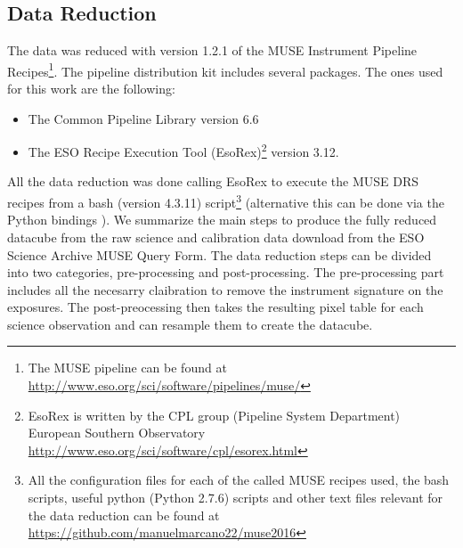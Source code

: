 \subsection{Data Reduction}

The data was reduced with version 1.2.1 of the MUSE Instrument Pipeline Recipes\footnote{The MUSE pipeline can be found at \url{http://www.eso.org/sci/software/pipelines/muse/}}\citep{weilbacher_design_2012}. The pipeline distribution kit includes several packages. The ones used for this work are the following:

\begin{itemize}
        \item The Common Pipeline Library version 6.6 \citep{mckay_common_2004}
        \item The ESO Recipe Execution Tool (EsoRex)\footnote{EsoRex is written by the CPL group (Pipeline System Department) European Southern Observatory \url{http://www.eso.org/sci/software/cpl/esorex.html}} version 3.12.
\end{itemize}

All the data reduction was done calling EsoRex to execute the MUSE DRS recipes from a bash (version 4.3.11) script\footnote{All the configuration files for each of the called MUSE recipes used, the bash scripts, useful python (Python 2.7.6) scripts and other text files relevant for the data reduction can be found at \url{https://github.com/manuelmarcano22/muse2016}} (alternative this can be done via the Python bindings \citep{streicher_python_2012}). We summarize the main steps to produce the fully reduced datacube from the raw science and calibration data download from the ESO Science Archive MUSE Query Form. The data reduction steps can be divided into two categories, pre-processing and post-processing. The pre-processing part includes all the necesarry claibration to remove the instrument signature on the exposures. The post-preocessing then takes the resulting pixel table for each science observation and can resample them to create the datacube.



